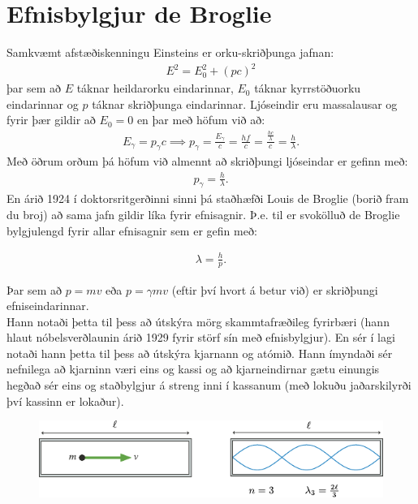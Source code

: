\section{Efnisbylgjur de Broglie}

Samkvæmt afstæðiskenningu Einsteins er orku-skriðþunga jafnan:
\begin{align*}
    E^2 = E_0^2 + (pc)^2
\end{align*}
þar sem að $E$ táknar heildarorku eindarinnar, $E_0$ táknar kyrrstöðuorku eindarinnar og $p$ táknar skriðþunga eindarinnar. Ljóseindir eru massalausar og fyrir þær gildir að $E_0 = 0$ en þar með höfum við að:
\begin{align*}
    E_\gamma = p_\gamma c \implies p_\gamma = \frac{E_\gamma}{c} = \frac{hf}{c} = \frac{\frac{hc}{\lambda}}{c} = \frac{h}{\lambda}.
\end{align*}
Með öðrum orðum þá höfum við almennt að skriðþungi ljóseindar er gefinn með:
\begin{align*}
    p_\gamma = \frac{h}{\lambda}.
\end{align*}
En árið 1924 í doktorsritgerðinni sinni þá staðhæfði Louis de Broglie (borið fram du broj) að sama jafn gildir líka fyrir efnisagnir. Þ.e. til er svokölluð de Broglie bylgjulengd fyrir allar efnisagnir sem er gefin með:
\begin{tcolorbox}
\begin{align*}
    \lambda = \frac{h}{p}.
\end{align*}
\end{tcolorbox}
Þar sem að $p = mv$ eða $p = \gamma mv$ (eftir því hvort á betur við) er skriðþungi efniseindarinnar. \\

Hann notaði þetta til þess að útskýra mörg skammtafræðileg fyrirbæri (hann hlaut nóbelsverðlaunin árið 1929 fyrir störf sín með efnisbylgjur). En sér í lagi notaði hann þetta til þess að útskýra kjarnann og atómið. Hann ímyndaði sér nefnilega að kjarninn væri eins og kassi og að kjarneindirnar gætu einungis hegðað sér eins og staðbylgjur á streng inni í kassanum (með lokuðu jaðarskilyrði því kassinn er lokaður).

\begin{figure}[H]
    \centering
    \includegraphics{figures/stadbylgja.pdf}
\end{figure}


